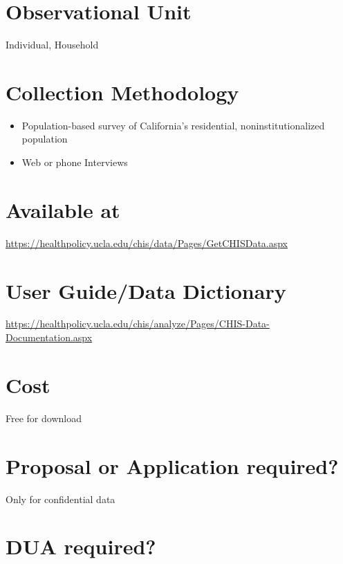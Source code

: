 \documentclass[
]{book}
\providecommand{\tightlist}{%
  \setlength{\itemsep}{0pt}\setlength{\parskip}{0pt}}
\begin{document}
\hypertarget{observational-unit-15}{%
\section{Observational Unit}\label{observational-unit-15}}

Individual, Household

\hypertarget{collection-methodology-15}{%
\section{Collection Methodology}\label{collection-methodology-15}}

\begin{itemize}
\tightlist
\item
  Population-based survey of California's residential, noninstitutionalized population
\item
  Web or phone Interviews
\end{itemize}

\hypertarget{available-at-15}{%
\section{Available at}\label{available-at-15}}

\url{https://healthpolicy.ucla.edu/chis/data/Pages/GetCHISData.aspx}

\hypertarget{user-guidedata-dictionary-15}{%
\section{User Guide/Data Dictionary}\label{user-guidedata-dictionary-15}}

\url{https://healthpolicy.ucla.edu/chis/analyze/Pages/CHIS-Data-Documentation.aspx}

\hypertarget{cost-15}{%
\section{Cost}\label{cost-15}}

Free for download

\hypertarget{proposal-or-application-required-15}{%
\section{Proposal or Application required?}\label{proposal-or-application-required-15}}

Only for confidential data

\hypertarget{dua-required-15}{%
\section{DUA required?}\label{dua-required-15}}
\end{document}
